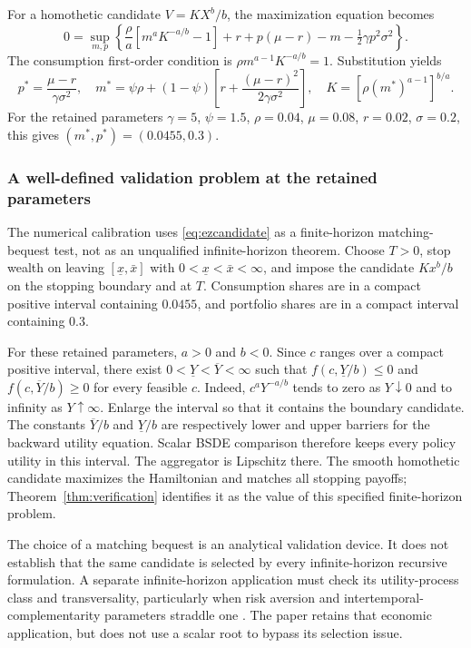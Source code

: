 For a homothetic candidate $V=KX^b/b$, the maximization equation becomes
\begin{equation}\label{eq:eznormalized}
 0=\sup_{m,p}\left\{\frac\rho a[m^aK^{-a/b}-1]
       +r+p(\mu-r)-m-\tfrac12\gamma p^2\sigma^2\right\}.
\end{equation}
The consumption first-order condition is $\rho m^{a-1}K^{-a/b}=1$. Substitution yields
\begin{equation}\label{eq:ezcandidate}
 p^*=\frac{\mu-r}{\gamma\sigma^2},\quad
 m^*=\psi\rho+(1-\psi)\left[r+\frac{(\mu-r)^2}{2\gamma\sigma^2}\right],\quad
 K=[\rho(m^*)^{a-1}]^{b/a}.
\end{equation}
For the retained parameters $\gamma=5$, $\psi=1.5$, $\rho=0.04$, $\mu=0.08$, $r=0.02$, $\sigma=0.2$, this gives $(m^*,p^*)=(0.0455,0.3)$.

\subsubsection{A well-defined validation problem at the retained parameters}
The numerical calibration uses \eqref{eq:ezcandidate} as a finite-horizon matching-bequest test, not as an unqualified infinite-horizon theorem. Choose $T>0$, stop wealth on leaving $[\underline x,\bar x]$ with $0<\underline x<\bar x<\infty$, and impose the candidate $Kx^b/b$ on the stopping boundary and at $T$. Consumption shares are in a compact positive interval containing $0.0455$, and portfolio shares are in a compact interval containing $0.3$.

For these retained parameters, $a>0$ and $b<0$. Since $c$ ranges over a compact positive interval, there exist $0<\underline Y<\overline Y<\infty$ such that $f(c,\underline Y/b)\leq0$ and $f(c,\overline Y/b)\geq0$ for every feasible $c$. Indeed, $c^aY^{-a/b}$ tends to zero as $Y\downarrow0$ and to infinity as $Y\uparrow\infty$. Enlarge the interval so that it contains the boundary candidate. The constants $\overline Y/b$ and $\underline Y/b$ are respectively lower and upper barriers for the backward utility equation. Scalar BSDE comparison therefore keeps every policy utility in this interval. The aggregator is Lipschitz there. The smooth homothetic candidate maximizes the Hamiltonian and matches all stopping payoffs; Theorem~\ref{thm:verification} identifies it as the value of this specified finite-horizon problem.

The choice of a matching bequest is an analytical validation device. It does not establish that the same candidate is selected by every infinite-horizon recursive formulation. A separate infinite-horizon application must check its utility-process class and transversality, particularly when risk aversion and intertemporal-complementarity parameters straddle one \citep{herdegen2021}. The paper retains that economic application, but does not use a scalar root to bypass its selection issue.

